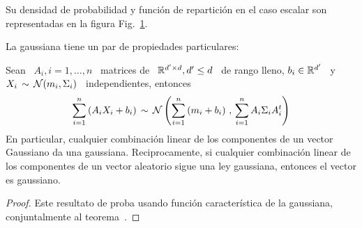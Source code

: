 Su densidad de probabilidad y funci\'on  de repartici\'on en el caso escalar son
representadas en la figura Fig.~\ref{Fig:MP:Gaussiana}.
%
\begin{figure}[h!]
\begin{center}  \end{center}
% 
\label{Fig:MP:Gaussiana}
\end{figure}


La gaussiana tiene un par de propiedades particulares:
%
\begin{teorema}[Stabilidad]
\label{Teo:MP:StabilidadGaussiana}
%
  Sean \ $A_i , i = 1,\ldots,n$ \  matrices de \ $\mathbb{R}^{d' \times d}, d' \le d$
  \ de rango lleno, $b_i \in \mathbb{R}^{d'}$ \ y \ $X_i \, \sim \, \mathcal{N}(m_i,\Sigma_i)$
  \ independientes, entonces
  \[
  \sum_{i=1}^n \left(  A_i X_i  + b_i \right)  \, \sim \,  \mathcal{N}\left( \sum_{i=1}^n
    \left( m_i + b_i \right) \, , \, \sum_{i=1}^n A_i \Sigma_i A_i^t \right)
  \]
  En particular, cualquier combinaci\'on linear  de los componentes de un vector
  Gaussiano da una gaussiana.  Reciprocamente, si cualquier combinaci\'on linear
  de los componentes de un vector aleatorio sigue una ley gaussiana, entonces el
  vector es gaussiano.
\end{teorema}
%
\begin{proof}
  Este  resultato de proba  usando funci\'on  caracter\'istica de  la gaussiana,
  conjuntalmente al teorema~\cite{Teo:MP:PropiedadesFuncionCaracteristica}.
\end{proof}

